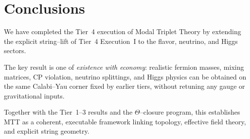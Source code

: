 \documentclass[11pt]{article}
\begin{document}
\section{Conclusions}

We have completed the Tier~4 execution of Modal Triplet Theory by
extending the explicit string--lift of Tier~4 Execution~I to the flavor,
neutrino, and Higgs sectors.

The key result is one of \emph{existence with economy}:
realistic fermion masses, mixing matrices, CP violation, neutrino
splittings, and Higgs physics can be obtained on the same Calabi--Yau
corner fixed by earlier tiers, without retuning any gauge or gravitational
inputs.

Together with the Tier~1--3 results and the $\Theta$--closure program,
this establishes MTT as a coherent, executable framework linking
topology, effective field theory, and explicit string geometry.
\end{document}
